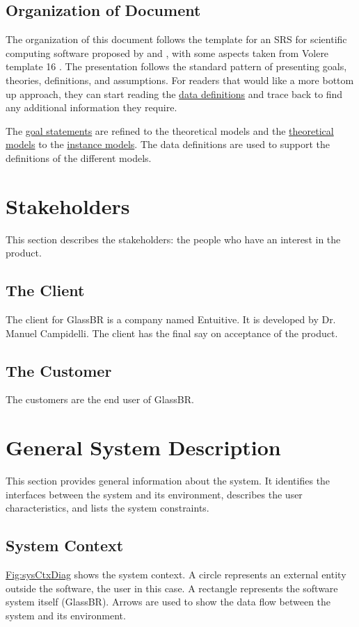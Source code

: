 \documentclass[12pt]{article}
\begin{document}
\subsection{Organization of Document}
\label{Sec:DocOrg}
The organization of this document follows the template for an SRS for scientific computing software proposed by \cite{koothoor2013} and \cite{smithLai2005}, with some aspects taken from Volere template 16 \cite{rbrtsn2012}. The presentation follows the standard pattern of presenting goals, theories, definitions, and assumptions. For readers that would like a more bottom up approach, they can start reading the \hyperref[Sec:IMs]{data definitions} and trace back to find any additional information they require.

The \hyperref[Sec:GoalStmt]{goal statements} are refined to the theoretical models and the \hyperref[Sec:TMs]{theoretical models} to the \hyperref[Sec:IMs]{instance models}. The data definitions are used to support the definitions of the different models.

\section{Stakeholders}
\label{Sec:Stakeholder}
This section describes the stakeholders: the people who have an interest in the product.

\subsection{The Client}
\label{Sec:Client}
The client for GlassBR is a company named Entuitive. It is developed by Dr. Manuel Campidelli. The client has the final say on acceptance of the product.

\subsection{The Customer}
\label{Sec:Customer}
The customers are the end user of GlassBR.

\section{General System Description}
\label{Sec:GenSysDesc}
This section provides general information about the system. It identifies the interfaces between the system and its environment, describes the user characteristics, and lists the system constraints.

\subsection{System Context}
\label{Sec:SysContext}
\hyperref[Figure:sysCtxDiag]{Fig:sysCtxDiag} shows the system context. A circle represents an external entity outside the software, the user in this case. A rectangle represents the software system itself (GlassBR). Arrows are used to show the data flow between the system and its environment.
\end{document}
